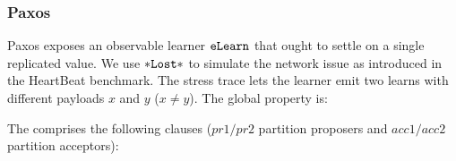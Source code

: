 \subsubsection*{Paxos}
Paxos exposes an observable learner \(\boldsymbol{{\tt eLearn}}\) that ought to settle on a single replicated value. We use $*\boldsymbol{{\tt Lost}}*$ to simulate the network issue as introduced in the \textsf{HeartBeat} benchmark. The stress trace lets the learner emit two learns with different payloads \(x\) and \(y\) (\(x\neq y\)). The global property is:
\vspace{-.35cm}\par{}
\vspace{-.4cm}\par\nobreak\noindent
The \tyName{} comprises the following clauses (\(\mathit{pr1}/\mathit{pr2}\) partition proposers and \(\mathit{acc1}/\mathit{acc2}\) partition acceptors):
